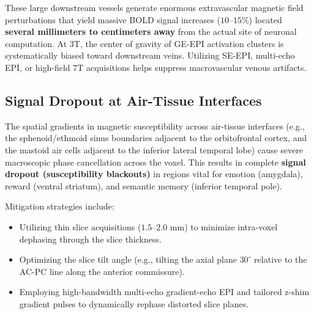 \documentclass[11pt,a4paper]{article}
\begin{document}
These large downstream vessels generate enormous extravascular magnetic field perturbations that yield massive BOLD signal increases ($10\text{--}15\%$) located \textbf{several millimeters to centimeters away} from the actual site of neuronal computation. At 3T, the center of gravity of GE-EPI activation clusters is systematically biased toward downstream veins. Utilizing SE-EPI, multi-echo EPI, or high-field 7T acquisitions helps suppress macrovascular venous artifacts.

\subsection{Signal Dropout at Air-Tissue Interfaces}
The spatial gradients in magnetic susceptibility across air-tissue interfaces (e.g., the sphenoid/ethmoid sinus boundaries adjacent to the orbitofrontal cortex, and the mastoid air cells adjacent to the inferior lateral temporal lobe) cause severe macroscopic phase cancellation across the voxel. This results in complete \textbf{signal dropout (susceptibility blackouts)} in regions vital for emotion (amygdala), reward (ventral striatum), and semantic memory (inferior temporal pole).

Mitigation strategies include:
\begin{itemize}
    \item Utilizing thin slice acquisitions ($1.5\text{--}2.0\text{ mm}$) to minimize intra-voxel dephasing through the slice thickness.
    \item Optimizing the slice tilt angle (e.g., tilting the axial plane $30^\circ$ relative to the AC-PC line along the anterior commissure).
    \item Employing high-bandwidth multi-echo gradient-echo EPI and tailored z-shim gradient pulses to dynamically rephase distorted slice planes.
\end{itemize}
\end{document}
